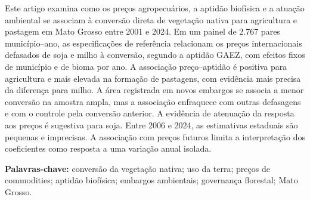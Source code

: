 Este artigo examina como os preços agropecuários, a aptidão biofísica e a atuação ambiental se associam à conversão direta de vegetação nativa para agricultura e pastagem em Mato Grosso entre 2001 e 2024. Em um painel de 2.767 pares município--ano, as especificações de referência relacionam os preços internacionais defasados de soja e milho à conversão, segundo a aptidão GAEZ, com efeitos fixos de município e de bioma por ano. A associação preço--aptidão é positiva para agricultura e mais elevada na formação de pastagens, com evidência mais precisa da diferença para milho. A área registrada em novos embargos se associa a menor conversão na amostra ampla, mas a associação enfraquece com outras defasagens e com o controle pela conversão anterior. A evidência de atenuação da resposta aos preços é sugestiva para soja. Entre 2006 e 2024, as estimativas estaduais são pequenas e imprecisas. A associação com preços futuros limita a interpretação dos coeficientes como resposta a uma variação anual isolada.

\vspace{0.4cm}
\noindent\textbf{Palavras-chave:} conversão da vegetação nativa; uso da terra; preços de commodities; aptidão biofísica; embargos ambientais; governança florestal; Mato Grosso.
